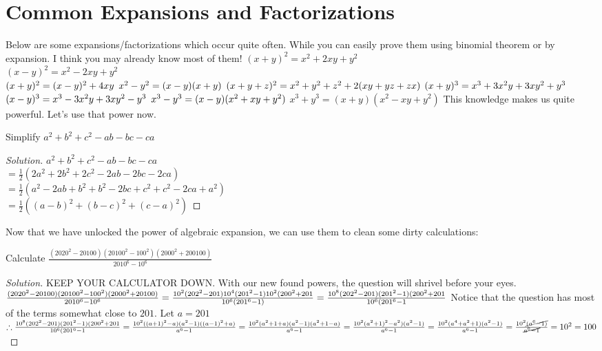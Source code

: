 \section{Common Expansions and Factorizations}
Below are some expansions/factorizations which occur quite often. While you can easily prove them using binomial theorem or by expansion. I think you may already know most of them!
$(x+y)^2=x^2+2xy+y^2$\\
$(x-y)^2=x^2-2xy+y^2$\\
$(x+y)^2=(x-y)^2 + 4xy\\$
$x^2-y^2=(x-y)(x+y)\\$
$(x+y+z)^2=x^2+y^2+z^2+2(xy+yz+zx)\\$
$(x+y)^3=x^3+3x^2y+3xy^2+y^3\\$
$(x-y)^3=x^3-3x^2y+3xy^2-y^3\\$
$x^3-y^3=(x-y)(x^2+xy+y^2)\\$
$x^3+y^3=(x+y)(x^2-xy+y^2)$
This knowledge makes us quite powerful. Let's use that power now.\\
\begin{example}
Simplify $a^2+b^2+c^2-ab-bc-ca$
\end{example}
\begin{proof}
    [Solution]
    $a^2+b^2+c^2-ab-bc-ca$\\
    $= \frac{1}{2}(2a^2+2b^2+2c^2-2ab-2bc-2ca)$\\
    $= \frac{1}{2}(a^2-2ab+b^2+b^2-2bc+c^2+c^2-2ca+a^2)$\\
    $= \frac{1}{2}((a-b)^2+(b-c)^2+(c-a)^2)$
\end{proof}
Now that we have unlocked the power of algebraic expansion, we can use them to clean some dirty calculations:\\
\begin{example}
    Calculate $\frac{(2020^2-20100)(20100^2-100^2)(2000^2+200100)}{2010^6-10^6}$
\end{example}
\begin{proof}
[Solution]
    KEEP YOUR CALCULATOR DOWN. With our new found powers, the  question will shrivel before your eyes.\\
    $\frac{(2020^2-20100)(20100^2-100^2)(2000^2+20100)}{2010^6-10^6}\\
    = \frac{10^2(202^2-201)10^4(201^2-1)10^2(200^2+201}{10^6(201^6-1)}\\
    = \frac{10^8(202^2-201)(201^2-1)(200^2+201}{10^6(201^6-1}\\$
    Notice that the question has most of the terms somewhat close to $201$. Let $a=201$
    $\therefore \frac{10^8(202^2-201)(201^2-1)(200^2+201}{10^6(201^6-1}\\
    = \frac{10^2((a+1)^2-a)(a^2-1)((a-1)^2+a)}{a^6-1}\\
    = \frac{10^2(a^2+1+a)(a^2-1)(a^2+1-a)}{a^6-1}\\
    = \frac{10^2(a^2+1)^2-a^2)(a^2-1)}{a^6-1}\\
    = \frac{10^2(a^4+a^2+1)(a^2-1)}{a^6-1}\\
    = \frac{10^2\cancel{(a^6-1)}}{\cancel{a^6-1}}\\
    =10^2=100$
\end{proof}
